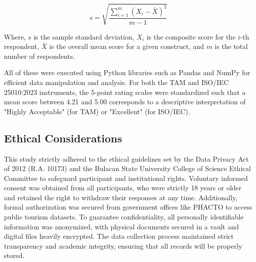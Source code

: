 \begin{equation}
	\label{S}
	s = \sqrt{\frac{\sum_{i=1}^{m} (X_i - \bar{X})^2}{m-1}}
\end{equation}

Where, $s$ is the sample standard deviation, $X_i$ is the composite score for the $i$-th respondent, $\bar{X}$ is the overall mean score for a given construct, and $m$ is the total number of respondents.

All of these were executed using Python libraries such as Pandas and NumPy for efficient data manipulation and analysis. For both the TAM and ISO/IEC 25010:2023 instruments, the 5-point rating scales were standardized such that a mean score between 4.21 and 5.00 corresponds to a descriptive interpretation of "Highly Acceptable" (for TAM) or "Excellent" (for ISO/IEC).


\subsection{Ethical Considerations}
This study strictly adhered to the ethical guidelines set by the Data Privacy Act of 2012 (R.A. 10173) and the Bulacan State University College of Science Ethical Committee to safeguard participant and institutional rights. Voluntary informed consent was obtained from all participants, who were strictly 18 years or older and retained the right to withdraw their responses at any time. Additionally, formal authorization was secured from government offices like PHACTO to access public tourism datasets. To guarantee confidentiality, all personally identifiable information was anonymized, with physical documents secured in a vault and digital files heavily encrypted. The data collection process maintained strict transparency and academic integrity, ensuring that all records will be properly stored.
